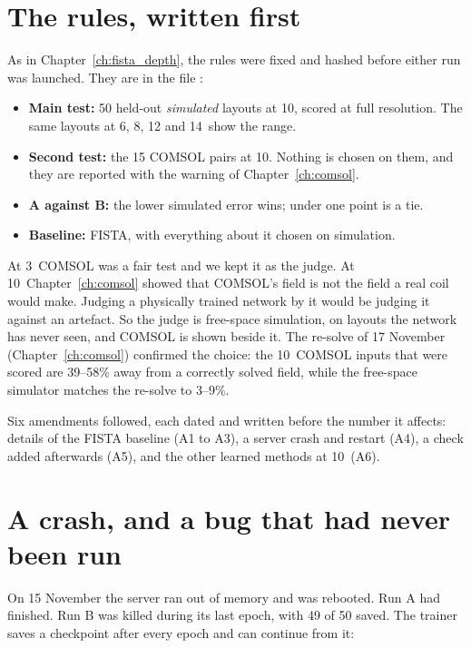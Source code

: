 \section{The rules, written first}

As in Chapter~\ref{ch:fista_depth}, the rules were fixed and hashed before either run was launched. They are in
the file :
\begin{itemize}
\item \textbf{Main test:} 50 held-out \emph{simulated} layouts at 10\um, scored at full resolution. The same layouts at 6, 8,
12 and 14\um\ show the range.
\item \textbf{Second test:} the 15 COMSOL pairs at 10\um. Nothing is chosen on them, and they are reported with the warning
of Chapter~\ref{ch:comsol}.
\item \textbf{A against B:} the lower simulated error wins; under one point is a tie.
\item \textbf{Baseline:} FISTA, with everything about it chosen on simulation.
\end{itemize}

\begin{keyidea}
At 3\um\ COMSOL was a fair test and we kept it as the judge. At 10\um\ Chapter~\ref{ch:comsol} showed that COMSOL's field
is not the field a real coil would make. Judging a physically trained network by it would be judging it against an
artefact. So the judge is free-space simulation, on layouts the network has never seen, and COMSOL is shown beside it.
The re-solve of 17 November (Chapter~\ref{ch:comsol}) confirmed the choice: the 10\um\ COMSOL inputs that were scored
are 39--58\% away from a correctly solved field, while the free-space simulator matches the re-solve to 3--9\%.
\end{keyidea}

Six amendments followed, each dated and written before the number it affects: details of the FISTA baseline (A1 to A3),
a server crash and restart (A4), a check added afterwards (A5), and the other learned methods at 10\um\ (A6).

\section{A crash, and a bug that had never been run}

On 15 November the server ran out of memory and was rebooted. Run A had finished. Run B was killed during its last
epoch, with 49 of 50 saved. The trainer saves a checkpoint after every epoch and can continue from it:

